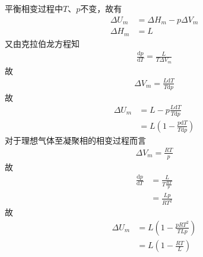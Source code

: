 \documentclass{phyasgn}
\renewcommand{\d}{\mathrm{d}}
\begin{document}
\begin{sol}[5]
    平衡相变过程中$T$、$p$不变，故有
    \begin{align*}
        \Delta U_m&=\Delta H_m-p\Delta V_m\\
        \Delta H_m&=L
    \end{align*}
    又由克拉伯龙方程知
    \begin{align*}
        \frac{\d p }{\d T}=\frac{L}{T\Delta V_m}
    \end{align*}
    故
    \begin{align*}
        \Delta V_m=\frac{L\d T}{T\d p}
    \end{align*}
    故
    \begin{align*}
        \Delta U_m&=L-p\frac{L\d T}{T\d p}\\
        &=L\left(1-\frac{p\d T}{T\d p}\right)
    \end{align*}
    对于理想气体至凝聚相的相变过程而言
    \begin{align*}
        \Delta V_m=\frac{RT}{p}
    \end{align*}
    故
    \begin{align*}
        \frac{\d p }{\d T}&=\frac{L}{T\frac{RT}{p}}\\
        &=\frac{Lp}{RT^2}
    \end{align*}
    故
    \begin{align*}
        \Delta U_m
        &=L\left(1-\frac{pRT^2}{TLp}\right)\\
        &=L\left(1-\frac{RT}{L}\right)
    \end{align*}
\end{sol}\par
\end{document}
